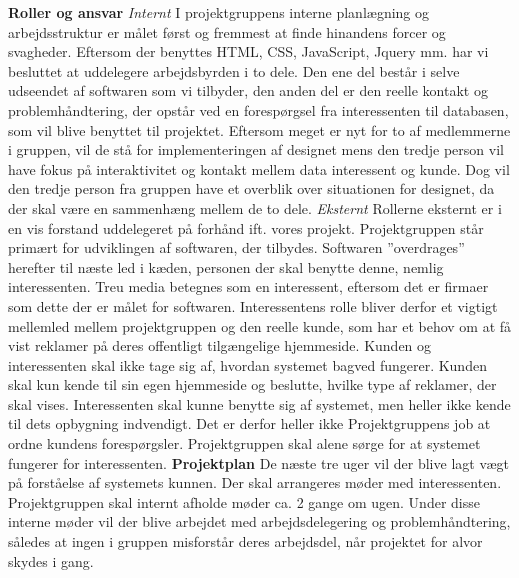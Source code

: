 \documentclass[a4paper,12pt]{article}
\begin{document}
\newline
\newline
\textbf{Roller og ansvar}
\newline
\textit{Internt}
\newline
I projektgruppens interne planlægning og arbejdsstruktur er målet først og fremmest at finde hinandens forcer og svagheder. Eftersom der benyttes HTML, CSS, JavaScript, Jquery mm. har vi besluttet at uddelegere arbejdsbyrden i to dele. Den ene del består i selve udseendet af softwaren som vi tilbyder, den anden del er den reelle kontakt og problemhåndtering, der opstår ved en forespørgsel fra interessenten til databasen, som vil blive benyttet til projektet.
Eftersom meget er nyt for to af medlemmerne i gruppen, vil de stå for implementeringen af designet mens den tredje person vil have fokus på interaktivitet og kontakt mellem data interessent og kunde.
Dog vil den tredje person fra gruppen have et overblik over situationen for designet, da der skal være en sammenhæng mellem de to dele.
\newline
\newline
\textit{Eksternt}
\newline
Rollerne eksternt er i en vis forstand uddelegeret på forhånd ift. vores projekt. Projektgruppen står primært for udviklingen af softwaren, der tilbydes. Softwaren ”overdrages” herefter til næste led i kæden, personen der skal benytte denne, nemlig interessenten. 
Treu media betegnes som en interessent, eftersom det er firmaer som dette der er målet for softwaren. Interessentens rolle bliver derfor et vigtigt mellemled mellem projektgruppen og den reelle kunde, som har et behov om at få vist reklamer på deres offentligt tilgængelige hjemmeside.
Kunden og interessenten skal ikke tage sig af, hvordan systemet bagved fungerer. Kunden skal kun kende til sin egen hjemmeside og beslutte, hvilke type af reklamer, der skal vises. Interessenten skal kunne benytte sig af systemet, men heller ikke kende til dets opbygning indvendigt.
Det er derfor heller ikke Projektgruppens job at ordne kundens forespørgsler. Projektgruppen skal alene sørge for at systemet fungerer for interessenten. 
\newline
\newline
\textbf{Projektplan}
\newline
De næste tre uger vil der blive lagt vægt på forståelse af systemets kunnen. 
Der skal arrangeres møder med interessenten. Projektgruppen skal internt afholde møder ca. 2 gange om ugen. Under disse interne møder vil der blive arbejdet med arbejdsdelegering og problemhåndtering, således at ingen i gruppen misforstår deres arbejdsdel, når projektet for alvor skydes i gang.
\end{document}
